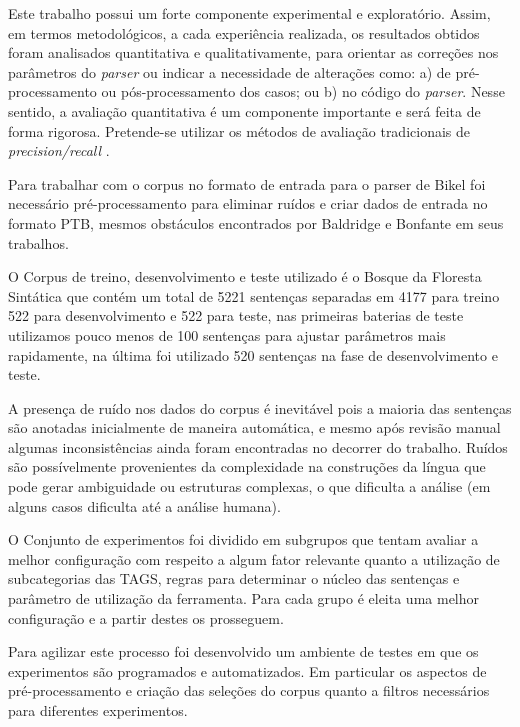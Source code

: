 Este trabalho possui um forte componente experimental e exploratório. Assim, em termos metodológicos, a cada experiência realizada, os resultados obtidos foram analisados quantitativa e qualitativamente, para orientar as correções nos parâmetros do \emph{parser} ou indicar a necessidade de alterações como: a) de pré-processamento ou pós-processamento dos casos; ou b) no código do \emph{parser}. Nesse sentido, a avaliação quantitativa é um componente importante e será feita de forma rigorosa. Pretende-se utilizar os métodos de avaliação tradicionais de \emph{precision/recall} \cite{black91}.

Para trabalhar com o corpus no formato de entrada para o parser de Bikel foi necessário pré-processamento para eliminar ruídos e criar dados de entrada no formato PTB, mesmos obstáculos encontrados por Baldridge \cite{baldridge06} e Bonfante\cite{bonfante03} em seus trabalhos. 

O Corpus de treino, desenvolvimento e teste utilizado é o Bosque da Floresta Sintática que contém um total de 5221 sentenças separadas em 4177 para treino 522 para desenvolvimento e 522 para teste, nas primeiras baterias de teste utilizamos pouco menos de 100 sentenças para ajustar parâmetros mais rapidamente, na última foi utilizado 520 sentenças na fase de desenvolvimento e teste.

A presença de ruído nos dados do corpus é inevitável pois a maioria das sentenças são anotadas inicialmente de maneira automática, e mesmo após revisão manual algumas inconsistências ainda foram encontradas no decorrer do trabalho. Ruídos são possívelmente provenientes da complexidade na construções da língua que pode gerar ambiguidade ou estruturas complexas, o que dificulta a análise (em alguns casos dificulta até a análise humana). 


O Conjunto de experimentos foi dividido em subgrupos que tentam avaliar a melhor configuração com respeito a algum fator relevante quanto a utilização de subcategorias das TAGS, regras para determinar o núcleo das sentenças e parâmetro de utilização da ferramenta. Para cada grupo é eleita uma melhor configuração e a partir destes os prosseguem.

Para agilizar este processo foi desenvolvido um ambiente de testes em que os experimentos são programados e automatizados. Em particular os aspectos de pré-processamento e criação das seleções do corpus quanto a filtros necessários para diferentes experimentos.



